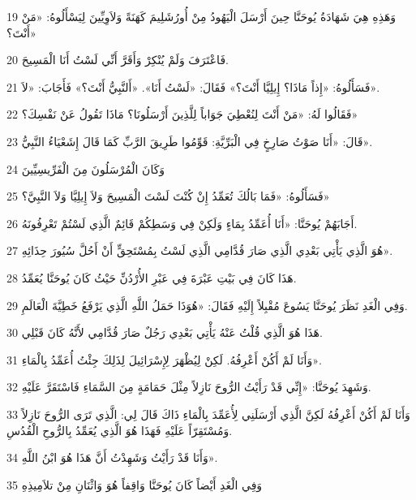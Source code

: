 \par 19 وَهَذِهِ هِيَ شَهَادَةُ يُوحَنَّا حِينَ أَرْسَلَ الْيَهُودُ مِنْ أُورُشَلِيمَ كَهَنَةً وَلاَوِيِّينَ لِيَسْأَلُوهُ: «مَنْ أَنْتَ؟»
\par 20 فَاعْتَرَفَ وَلَمْ يُنْكِرْ وَأَقَرَّ أَنِّي لَسْتُ أَنَا الْمَسِيحَ.
\par 21 فَسَأَلُوهُ: «إِذاً مَاذَا؟ إِيلِيَّا أَنْتَ؟» فَقَالَ: «لَسْتُ أَنَا». «أَلنَّبِيُّ أَنْتَ؟» فَأَجَابَ: «لاَ».
\par 22 فَقَالُوا لَهُ: «مَنْ أَنْتَ لِنُعْطِيَ جَوَاباً لِلَّذِينَ أَرْسَلُونَا؟ مَاذَا تَقُولُ عَنْ نَفْسِكَ؟»
\par 23 قَالَ: «أَنَا صَوْتُ صَارِخٍ فِي الْبَرِّيَّةِ: قَوِّمُوا طَرِيقَ الرَّبِّ كَمَا قَالَ إِشَعْيَاءُ النَّبِيُّ».
\par 24 وَكَانَ الْمُرْسَلُونَ مِنَ الْفَرِّيسِيِّينَ
\par 25 فَسَأَلُوهُ: «فَمَا بَالُكَ تُعَمِّدُ إِنْ كُنْتَ لَسْتَ الْمَسِيحَ وَلاَ إِيلِيَّا وَلاَ النَّبِيَّ؟»
\par 26 أَجَابَهُمْ يُوحَنَّا: «أَنَا أُعَمِّدُ بِمَاءٍ وَلَكِنْ فِي وَسَطِكُمْ قَائِمٌ الَّذِي لَسْتُمْ تَعْرِفُونَهُ.
\par 27 هُوَ الَّذِي يَأْتِي بَعْدِي الَّذِي صَارَ قُدَّامِي الَّذِي لَسْتُ بِمُسْتَحِقٍّ أَنْ أَحُلَّ سُيُورَ حِذَائِهِ».
\par 28 هَذَا كَانَ فِي بَيْتِ عَبْرَةَ فِي عَبْرِ الأُرْدُنِّ حَيْثُ كَانَ يُوحَنَّا يُعَمِّدُ.
\par 29 وَفِي الْغَدِ نَظَرَ يُوحَنَّا يَسُوعَ مُقْبِلاً إِلَيْهِ فَقَالَ: «هُوَذَا حَمَلُ اللَّهِ الَّذِي يَرْفَعُ خَطِيَّةَ الْعَالَمِ.
\par 30 هَذَا هُوَ الَّذِي قُلْتُ عَنْهُ يَأْتِي بَعْدِي رَجُلٌ صَارَ قُدَّامِي لأَنَّهُ كَانَ قَبْلِي.
\par 31 وَأَنَا لَمْ أَكُنْ أَعْرِفُهُ. لَكِنْ لِيُظْهَرَ لِإِسْرَائِيلَ لِذَلِكَ جِئْتُ أُعَمِّدُ بِالْمَاءِ».
\par 32 وَشَهِدَ يُوحَنَّا: «إِنِّي قَدْ رَأَيْتُ الرُّوحَ نَازِلاً مِثْلَ حَمَامَةٍ مِنَ السَّمَاءِ فَاسْتَقَرَّ عَلَيْهِ.
\par 33 وَأَنَا لَمْ أَكُنْ أَعْرِفُهُ لَكِنَّ الَّذِي أَرْسَلَنِي لِأُعَمِّدَ بِالْمَاءِ ذَاكَ قَالَ لِي: الَّذِي تَرَى الرُّوحَ نَازِلاً وَمُسْتَقِرّاً عَلَيْهِ فَهَذَا هُوَ الَّذِي يُعَمِّدُ بِالرُّوحِ الْقُدُسِ.
\par 34 وَأَنَا قَدْ رَأَيْتُ وَشَهِدْتُ أَنَّ هَذَا هُوَ ابْنُ اللَّهِ».
\par 35 وَفِي الْغَدِ أَيْضاً كَانَ يُوحَنَّا وَاقِفاً هُوَ وَاثْنَانِ مِنْ تلاَمِيذِهِ
